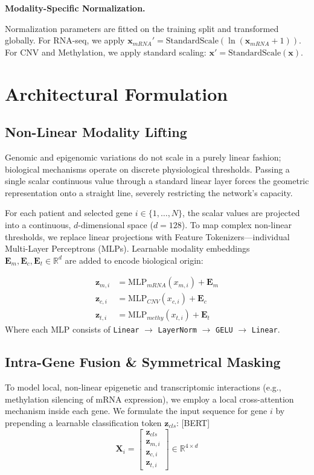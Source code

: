 \documentclass[10pt, twocolumn]{article}
\begin{document}
\noindent
\textbf{Modality-Specific Normalization.} 

Normalization parameters are fitted on the training split and transformed globally. For RNA-seq, we apply $\mathbf{x}_{mRNA}' = \text{StandardScale}(\ln(\mathbf{x}_{mRNA} + 1))$. For CNV and Methylation, we apply standard scaling: $\mathbf{x}' = \text{StandardScale}(\mathbf{x})$.



\section{Architectural Formulation}

\subsection{Non-Linear Modality Lifting}
Genomic and epigenomic variations do not scale in a purely linear fashion; biological mechanisms operate on discrete physiological thresholds. Passing a single scalar continuous value through a standard linear layer forces the geometric representation onto a straight line, severely restricting the network's capacity.

For each patient and selected gene $i \in \{1, \dots, N\}$, the scalar values are projected into a continuous, $d$-dimensional space ($d=128$). To map complex non-linear thresholds, we replace linear projections with Feature Tokenizers—individual Multi-Layer Perceptrons (MLPs). Learnable modality embeddings $\mathbf{E}_m, \mathbf{E}_c, \mathbf{E}_t \in \mathbb{R}^d$ are added to encode biological origin:

\begin{align}
    \mathbf{z}_{m,i} &= \text{MLP}_{mRNA}(x_{m,i}) + \mathbf{E}_{m} \\
    \mathbf{z}_{c,i} &= \text{MLP}_{CNV}(x_{c,i}) + \mathbf{E}_{c} \\
    \mathbf{z}_{t,i} &= \text{MLP}_{methy}(x_{t,i}) + \mathbf{E}_{t}
\end{align}
Where each MLP consists of \texttt{Linear} $\rightarrow$ \texttt{LayerNorm} $\rightarrow$ \texttt{GELU} $\rightarrow$ \texttt{Linear}.

\subsection{Intra-Gene Fusion \& Symmetrical Masking}
To model local, non-linear epigenetic and transcriptomic interactions (e.g., methylation silencing of mRNA expression), we employ a local cross-attention mechanism inside each gene. We formulate the input sequence for gene $i$ by prepending a learnable classification token $\mathbf{z}_{cls}$: [BERT]
\begin{equation}
    \mathbf{X}_i = \begin{bmatrix} \mathbf{z}_{cls} \\ \mathbf{z}_{m,i} \\ \mathbf{z}_{c,i} \\ \mathbf{z}_{t,i} \end{bmatrix} \in \mathbb{R}^{4 \times d}
\end{equation}
\end{document}
